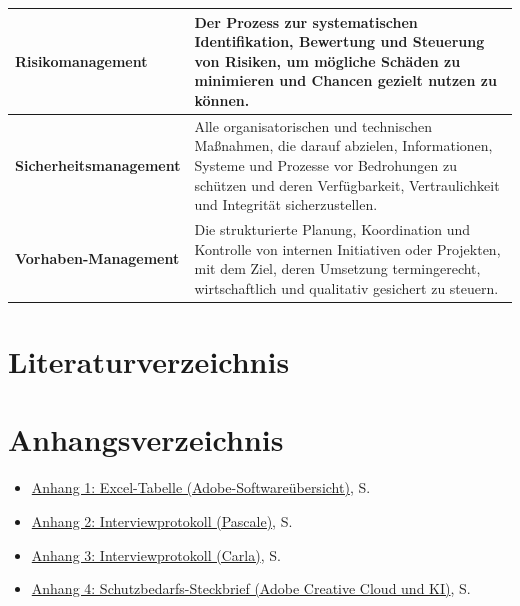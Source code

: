 \documentclass[
    12pt, 
    a4paper,
    ]{scrartcl} %
\begin{document}
    \newpage
    \begin{tabular}{p{4cm} p{11.35cm}} 
    \hline
    \textbf{\normalsize Risikomanagement} & \normalsize Der Prozess zur systematischen Identifikation, Bewertung und Steuerung von Risiken, um mögliche Schäden zu minimieren und Chancen gezielt nutzen zu können. \\[0.5cm]
    \hline
    \textbf{\normalsize Sicherheitsmanagement} & \normalsize Alle organisatorischen und technischen Maßnahmen, die darauf abzielen, Informationen, Systeme und Prozesse vor Bedrohungen zu schützen und deren Verfügbarkeit, Vertraulichkeit und Integrität sicherzustellen. \\[0.5cm]
    \hline
    \textbf{\normalsize Vorhaben-Management} & \normalsize Die strukturierte Planung, Koordination und Kontrolle von internen Initiativen oder Projekten, mit dem Ziel, deren Umsetzung termingerecht, wirtschaftlich und qualitativ gesichert zu steuern. \\[0.5cm]
    \end{tabular}


\clearpage
{}
{}
\section*{Literaturverzeichnis}
\renewcommand{\refname}{} %
\vspace{-\baselineskip} %

\clearpage
{}
{}
\section*{Anhangsverzeichnis}
\vspace{0.6cm}
\begin{itemize}
    \item \hyperref[sec:Anhang1]{Anhang 1: Excel-Tabelle (Adobe-Softwareübersicht)}, S. \pageref{sec:Anhang1}
    \item \hyperref[sec:Anhang2]{Anhang 2: Interviewprotokoll (Pascale)}, S. \pageref{sec:Anhang2}
    \item \hyperref[sec:Anhang3]{Anhang 3: Interviewprotokoll (Carla)}, S. \pageref{sec:Anhang3}
    \item \hyperref[sec:Anhang4]{Anhang 4: Schutzbedarfs-Steckbrief (Adobe Creative Cloud und KI)}, S. \pageref{sec:Anhang4}
\end{itemize}
\end{document}
